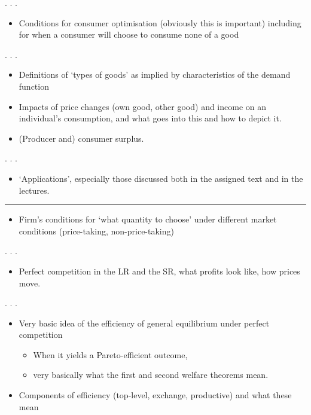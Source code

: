 \documentclass[]{article}
\providecommand{\tightlist}{%
  \setlength{\itemsep}{0pt}\setlength{\parskip}{0pt}}
\begin{document}
. . .

\begin{itemize}
\tightlist
\item
  Conditions for consumer optimisation (obviously this is important) including for when a consumer will choose to consume none of a good
\end{itemize}

\bigskip

. . .

\begin{itemize}
\item
  Definitions of `types of goods' as implied by characteristics of the demand function
\item
  Impacts of price changes (own good, other good) and income on an individual's consumption, and what goes into this and how to depict it.
\item
  (Producer and) consumer surplus.
\end{itemize}

. . .

\bigskip

\begin{itemize}
\tightlist
\item
  `Applications', especially those discussed both in the assigned text and in the lectures.
\end{itemize}

\begin{center}\rule{0.5\linewidth}{\linethickness}\end{center}

\begin{itemize}
\tightlist
\item
  Firm's conditions for `what quantity to choose' under different market conditions (price-taking, non-price-taking)
\end{itemize}

. . .

\bigskip

\begin{itemize}
\tightlist
\item
  Perfect competition in the LR and the SR, what profits look like, how prices move.
\end{itemize}

. . .

\begin{itemize}
\tightlist
\item
  Very basic idea of the efficiency of general equilibrium under perfect competition

  \begin{itemize}
  \item
    When it yields a Pareto-efficient outcome,
  \item
    very basically what the first and second welfare theorems mean.
  \end{itemize}
\item
  Components of efficiency (top-level, exchange, productive) and what these mean
\end{itemize}
\end{document}
